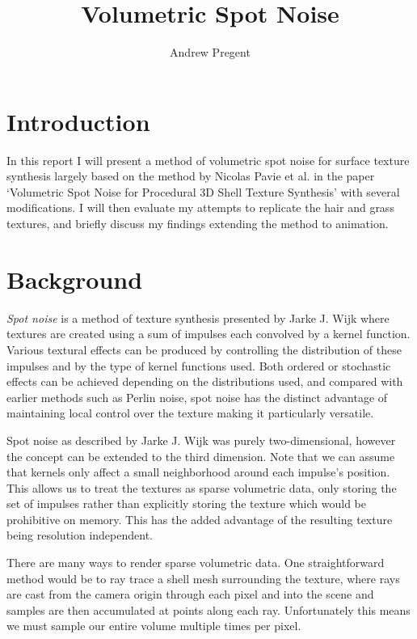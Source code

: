 \documentclass{article}
\title{\vspace{-1cm}Volumetric Spot Noise}
\date{}
\author{Andrew Pregent}
\begin{document}
\maketitle{}

\section{Introduction}

In this report I will present a method of volumetric spot noise for surface texture synthesis largely based on the method by Nicolas Pavie et al. in the paper `Volumetric Spot Noise for Procedural 3D Shell Texture Synthesis' \cite{pavie:hal-02413269} with several modifications. I will then evaluate my attempts to replicate the hair and grass textures, and briefly discuss my findings extending the method to animation.

\section{Background}

\par \textit{Spot noise} is a method of texture synthesis presented by Jarke J. Wijk where textures are created using a sum of impulses each convolved by a kernel function.\cite{10.1145/127719.122751}
Various textural effects can be produced by controlling the distribution of these impulses and by the type of kernel functions used.
Both ordered or stochastic effects can be achieved depending on the distributions used, and 
compared with earlier methods such as Perlin noise, spot noise has the distinct advantage of maintaining local control over the texture making it particularly versatile.

\par Spot noise as described by Jarke J. Wijk was purely two-dimensional, however the concept can be extended to the third dimension. Note that we can assume that kernels only affect a small neighborhood around each impulse's position. This allows us to treat the textures as sparse volumetric data, only storing the set of impulses rather than explicitly storing the texture which would be prohibitive on memory. This has the added advantage of the resulting texture being resolution independent.

There are many ways to render sparse volumetric data. One straightforward method would be to ray trace a shell mesh surrounding the texture, where rays are cast from the camera origin through each pixel and into the scene and samples are then accumulated at points along each ray. Unfortunately this means we must sample our entire volume multiple times per pixel.
\end{document}
